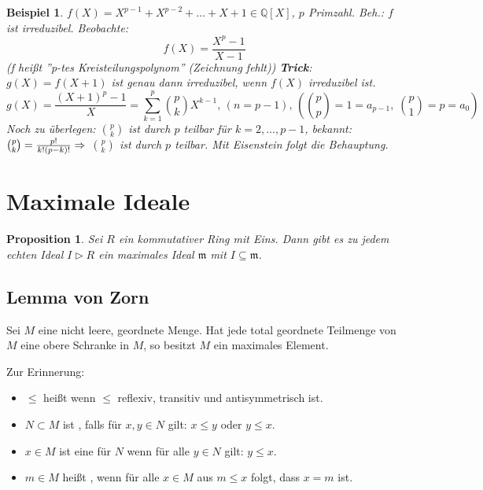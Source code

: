 \documentclass[a4paper,10pt,german]{scrbook}
\theoremstyle{saetze}
\theoremstyle{definitionen}
\newtheorem{Prop}[Def]{Proposition}
\newtheorem{Bsp}[Def]{Beispiel}
\begin{document}
\begin{Bsp}
\label{Bsp 2.27}
$f(X) = X^{p-1} + X ^{p-2} + \dots + X + 1
\in \mathbb{Q}[X]$, $p$ Primzahl. Beh.: $f$ ist irreduzibel.
\newline Beobachte: \[f(X) = \frac{X^p - 1}{X - 1}\] (f heißt ''p-tes
Kreisteilungspolynom'' (Zeichnung fehlt))
\newline \textbf{Trick}: $g(X) = f(X + 1)$ ist genau dann
irreduzibel, wenn $f(X)$ irreduzibel ist. \[g(X) = \frac{(X+1)^p -
1}{X} = \sum_{k=1}^p \binom{p}{k} X^{k-1}\mbox{, }(n=p-1)\mbox{, }(\binom{p}{p} = 1 =
a_{p-1},\;\binom{p}{1} = p = a_0)\] Noch zu überlegen: $\binom{p}{k}$
ist durch $p$ teilbar für $k=2,\dots,p-1$, bekannt: $\binom{p}{k} =
\frac{p!}{k!(p-k)!} \Rightarrow$ $\binom{p}{k}$ ist durch $p$ teilbar. Mit
Eisenstein folgt die Behauptung.
\end{Bsp}

\section{Maximale Ideale}

\begin{Prop}
Sei $R$ ein kommutativer Ring mit Eins. Dann gibt es zu jedem echten Ideal $I\triangleright R$ ein maximales Ideal $\mathfrak m$ mit $I\subseteq \mathfrak m$.
\end{Prop}

\subsection*{Lemma von Zorn}

Sei $M$ eine nicht leere, geordnete Menge. Hat jede total geordnete Teilmenge von $M$ eine obere Schranke in $M$, so besitzt $M$ ein maximales Element.

Zur Erinnerung:
\begin{itemize}
\item $\le$ heißt  wenn $\le$ reflexiv, transitiv und antisymmetrisch ist.
\item $N\subset M$ ist , falls für $x,y\in N$ gilt: $x\le y$ oder $y\le x$.
\item $x\in M$ ist eine  für $N$ wenn für alle $y\in N$ gilt: $y\le x$.
\item $m\in M$ heißt , wenn für alle $x\in M$ aus $m\le x$ folgt, dass $x=m$ ist.
\end{itemize}

\end{document}
